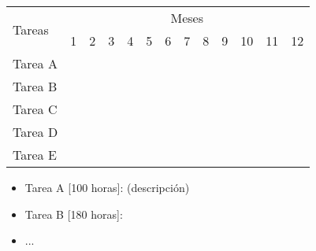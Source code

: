 \documentclass[12pt, oneside]{book}
\begin{document}
\begin{center}
    \def\arraystretch{1.5}
    \begin{tabular}{ |l|c|c|c|c|c|c|c|c|c|c|c|c| }

        \hline
        \multirow{2}{1em}{Tareas} & \multicolumn{12}{|c|}{Meses}                                                                                                                                                                      \\  \cline{2-13} &
        1                         & 2                            & 3                & 4                & 5                & 6                & 7                & 8 & 9 & 10 & 11               & 12                                  \\  \hline
        Tarea A                   & \cellcolor{gray}             & \cellcolor{gray} &                  &                  &                  &                  &   &   &    &                  &                  &                  \\
        \hline
        Tarea B                   &                              & \cellcolor{gray} & \cellcolor{gray} &                  &                  &                  &   &   &    &                  &                  &                  \\
        \hline
        Tarea C                   &                              & \cellcolor{gray} & \cellcolor{gray} & \cellcolor{gray} & \cellcolor{gray} & \cellcolor{gray} &   &   &    &                  &                  &                  \\
        \hline
        Tarea D                   &                              &                  &                  &                  &                  &                  &   &   &    &                  &                  &                  \\
        \hline
        Tarea E                   &                              &                  &                  &                  &                  &                  &   &   &    & \cellcolor{gray} & \cellcolor{gray} & \cellcolor{gray} \\
        \hline
    \end{tabular}
\end{center}

\bigskip

\begin{itemize}
    \item Tarea A [100 horas]: (descripción)
    \item Tarea B [180 horas]:
    \item ...
\end{itemize}

\bigskip




\end{document}

